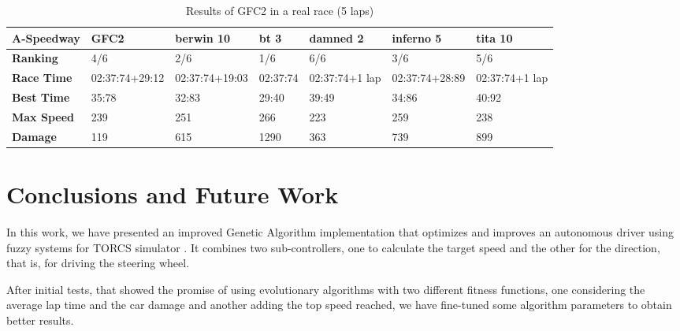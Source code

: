 \documentclass[conference]{IEEEtran}
\begin{document}
\begin{table*}[!ht]
	\centering
	{\scriptsize
		\caption{Results of GFC2 in a real race (5 laps)}
		\label{tab:gfc2real2}
		\begin{tabular}{|p{2 cm}|p{1.5 cm}|p{1.5 cm}|p{1.5 cm}|p{1.5 cm}|p{1.5 cm}|p{1.5 cm}|}
			\hline \textbf{A-Speedway} & \textbf{GFC2}&\textbf{berwin 10} & \textbf{bt 3} &\textbf{damned 2} & \textbf{inferno 5} & \textbf{tita 10}  \\
			\hline \textbf{Ranking} & 4/6&2/6&1/6&6/6&3/6&5/6\\			
			\hline \textbf{Race Time}	& 02:37:74\newline +29:12&  02:37:74\newline +19:03&02:37:74&02:37:74\newline+1 lap&02:37:74\newline+28:89&02:37:74\newline+1 lap\\	
			\hline \textbf{Best Time}& 35:78 &32:83&29:40&39:49&34:86&40:92\\	
			\hline \textbf{Max Speed}& 239&251&266&223&259&238\\	
			\hline \textbf{Damage}& 119& 615&1290 &363&739&899\\	
			\hline 
		\end{tabular}
	}
\end{table*} 


\section{Conclusions and Future Work} 
\label{sec:conclusions}

In this work, we have presented an improved Genetic Algorithm implementation that optimizes and improves an autonomous driver using fuzzy systems for TORCS simulator \cite{evo17}. It combines two sub-controllers, one to calculate the target speed and the other for the direction, that is, for driving the steering wheel.

After initial tests, that showed the promise of using evolutionary algorithms with two different fitness functions, one considering the average lap time and the car damage and another adding the top speed reached, we have fine-tuned some algorithm parameters to obtain better results. %
\end{document}
